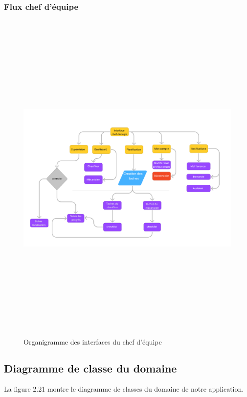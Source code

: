 \subsubsection{Flux chef d'équipe}
\begin{figure}[htbp]
  \centering
  \includegraphics[width=1\textwidth,height=17cm]{chap2.images/org chef d'equipe.png}
  \caption{Organigramme des interfaces du chef d'équipe}
\end{figure}




\newpage
\subsection{Diagramme de classe du domaine}

La figure 2.21 montre le diagramme de classes du domaine de notre application.








